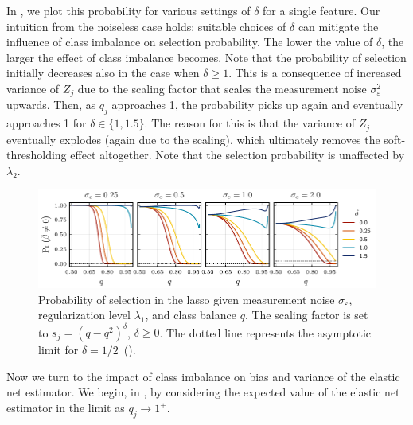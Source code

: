 In , we plot this probability for various settings of
\(\delta\) for a single feature. Our intuition from the noiseless case holds: suitable
choices of \(\delta\) can mitigate the influence of class imbalance on selection
probability. The lower the value of \(\delta\), the larger the effect of class imbalance
becomes. Note that the probability of selection initially decreases also in the case when
\(\delta \geq 1\). This is a consequence of increased variance of \({Z_j}\) due to the
scaling factor that scales the measurement noise \(\sigma_\varepsilon^2\) upwards. Then, as
\(q_j\) approaches 1, the probability picks up again and eventually approaches 1 for
\(\delta \in \{1, 1.5\}\). The reason for this is that the variance of \({Z_j}\) eventually
explodes (again due to the scaling), which ultimately removes the soft-thresholding effect
altogether. Note that the selection probability is unaffected by \(\lambda_2\).

\begin{figure}[htpb]
  \centering
  \includegraphics[]{plots/selection_probability.pdf}
  \caption{%
    Probability of selection in the lasso given measurement noise
    \(\sigma_\varepsilon\), regularization level \(\lambda_1\), and class
    balance \(q\). The scaling factor is set to \(s_j = (q - q^2)^\delta\),
    \(\delta \geq 0\). The dotted line represents the asymptotic limit for
    \(\delta = 1/2\)~().
    \label{fig:selection-probability}}
\end{figure}

Now we turn to the impact of class imbalance on bias and variance of the elastic net
estimator. We begin, in , by considering the expected value of
the elastic net estimator in the limit as \(q_j \rightarrow 1^+\).

